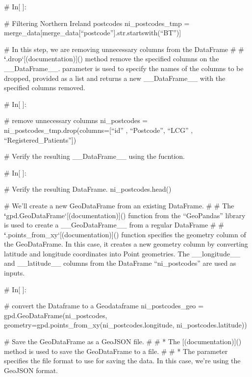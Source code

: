 \documentclass[letterpaper,10pt,english]{sphinxmanual}
\begin{document}
\sphinxAtStartPar
\# In{[} {]}:

\sphinxAtStartPar
\# Filtering Northern Ireland postcodes
ni\_postcodes\_tmp = merge\_data{[}merge\_data{[}“postcode”{]}.str.startswith(“BT”){]}

\sphinxAtStartPar
\# In this step, we are removing unnecessary columns from the DataFrame
\#
\# {\color{red}\bfseries{}`}.drop`{[}(documentation){]}()  method remove the specified columns on the \_\_DataFrame\_\_. parameter is used to specify the names of the columns to be dropped, provided as a list and returns a new \_\_DataFrame\_\_ with the specified columns removed.

\sphinxAtStartPar
\# In{[} {]}:

\sphinxAtStartPar
\# remove unnecessary columns
ni\_postcodes = ni\_postcodes\_tmp.drop(columns={[}“id” , “Postcode”, “LCG” , “Registered\_Patients”{]})

\sphinxAtStartPar
\# Verify the resulting \_\_DataFrame\_\_ using the  fucntion.

\sphinxAtStartPar
\# In{[} {]}:

\sphinxAtStartPar
\# Verify the resulting DataFrame.
ni\_postcodes.head()

\sphinxAtStartPar
\# We’ll create a new GeoDataFrame from an existing DataFrame.
\#
\# The {\color{red}\bfseries{}`}gpd.GeoDataFrame`{[}(documentation){]}() function from the “GeoPandas” library is used to create a \_\_GeoDataFrame\_\_ from a regular DataFrame
\#
\# {\color{red}\bfseries{}`}.points\_from\_xy`{[}(documentation){]}() function specifies the geometry column of the GeoDataFrame. In this case, it creates a new geometry column by converting latitude and longitude coordinates into Point geometries. The \_\_longitude\_\_ and \_\_latitude\_\_ columns from the DataFrame “ni\_postcodes” are used as inputs.

\sphinxAtStartPar
\# In{[} {]}:

\sphinxAtStartPar
\# convert the Dataframe to a Geodataframe
ni\_postcodes\_geo = gpd.GeoDataFrame(ni\_postcodes, geometry=gpd.points\_from\_xy(ni\_postcodes.longitude, ni\_postcodes.latitude))

\sphinxAtStartPar
\# Save the GeoDataFrame as a GeoJSON file.
\#
\# * The  {[}(documentation){]}() method is used to save the GeoDataFrame to a file.
\#
\# * The  parameter specifies the file format to use for saving the data. In this case, we’re using the GeoJSON format.
\end{document}

